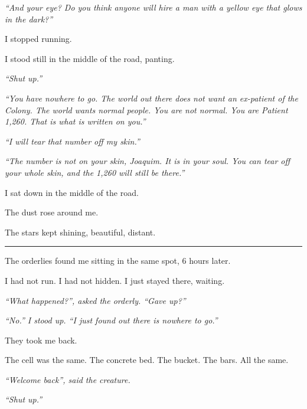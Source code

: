 \noindent \textit{\textquotedblleft{}And your eye? Do you think anyone will hire a man with a yellow eye that glows in the dark?\textquotedblright{}}

\noindent I stopped running.

\noindent I stood still in the middle of the road, panting.

\noindent \textit{\textquotedblleft{}Shut up.\textquotedblright{}}

\noindent \textit{\textquotedblleft{}You have nowhere to go. The world out there does not want an ex-patient of the Colony. The world wants normal people. You are not normal. You are Patient 1,260. That is what is written on you.\textquotedblright{}}

\noindent \textit{\textquotedblleft{}I will tear that number off my skin.\textquotedblright{}}

\noindent \textit{\textquotedblleft{}The number is not on your skin, Joaquim. It is in your soul. You can tear off your whole skin, and the 1,260 will still be there.\textquotedblright{}}

\noindent I sat down in the middle of the road.

\noindent The dust rose around me.

\noindent The stars kept shining, beautiful, distant.

\vspace{0.5em}\noindent\rule{\textwidth}{0.5pt}\vspace{0.5em}

\noindent The orderlies found me sitting in the same spot, 6 hours later.

\noindent I had not run.
I had not hidden.
I just stayed there, waiting.

\noindent \textit{\textquotedblleft{}What happened?\textquotedblright{}\textit{, asked the orderly. }\textquotedblleft{}Gave up?\textquotedblright{}}

\noindent \textit{\textquotedblleft{}No.\textquotedblright{}\textit{ I stood up. }\textquotedblleft{}I just found out there is nowhere to go.\textquotedblright{}}

\noindent They took me back.

\noindent The cell was the same. The concrete bed. The bucket. The bars. All the same.

\noindent \textit{\textquotedblleft{}Welcome back\textquotedblright{}, said the creature.}

\noindent \textit{\textquotedblleft{}Shut up.\textquotedblright{}}


